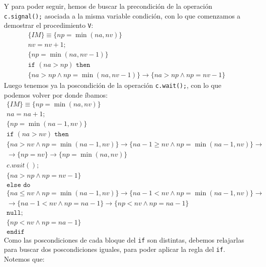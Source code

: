 \begin{ejercicio*}
\begin{enumerate}
            Y para poder seguir, hemos de buscar la precondición de la operación \verb|c.signal();| asociada a la misma variable condición, con lo que comenzamos a demostrar el procedimiento \verb|V|:
            \begin{gather*}
                \{IM\} \equiv \{np = \min(na,nv)\} \\
                nv = nv + 1; \\
                \{np = \min(na,nv-1)\} \\
                \texttt{if\ } (na > np) \texttt{\ then\ } \\
                \{na > np \land np = \min(na,nv-1)\} \rightarrow \{na > np \land np = nv-1\}
            \end{gather*}
            Luego tenemos ya la poscondición de la operación \verb|c.wait();|, con lo que podemos volver por donde íbamos:
            \begin{gather*}
                \{IM\} \equiv \{np = \min(na,nv)\} \\
                na = na + 1;\\
                \{np = \min(na-1,nv)\} \\
                \texttt{if\ }(na > nv) \texttt{\ then\ } \\
                \{na > nv \land np = \min(na-1,nv)\} \rightarrow \{na-1\geq nv \land np = \min(na-1,nv)\} \rightarrow \\ 
                \rightarrow\{np = nv\} \rightarrow \{np = \min(na,nv)\} \\
                c.wait(); \\
                \{na > np \land np = nv - 1\} \\
                \texttt{else do} \\
                \{na \leq nv \land np = \min(na-1,nv)\} \rightarrow \{na-1 < nv \land np = \min(na-1,nv)\} \rightarrow \\
                \rightarrow \{na-1 < nv \land np = na-1\} \rightarrow \{np < nv \land np = na-1\} \\
                \texttt{null;} \\
                \{np < nv \land np = na -1\} \\
                \texttt{endif}
            \end{gather*}
            Como las poscondiciones de cada bloque del \verb|if| son distintas, debemos relajarlas para buscar dos poscondiciones iguales, para poder aplicar la regla del \verb|if|. Notemos que:
            \begin{gather*}

\end{gather*}
\end{enumerate}
\end{ejercicio*}
